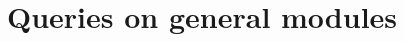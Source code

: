\documentclass{article}
\begin{document}

% 




















% 



\section{Queries on general modules}
\end{document}
